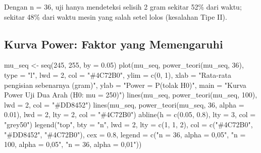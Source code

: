 \documentclass[
  indonesian,
  letterpaper,
]{book}
\newenvironment{Shaded}{\begin{snugshade}}{\end{snugshade}}
\newcommand{\AttributeTok}[1]{\textcolor[rgb]{0.40,0.45,0.13}{#1}}
\newcommand{\DecValTok}[1]{\textcolor[rgb]{0.68,0.00,0.00}{#1}}
\newcommand{\FloatTok}[1]{\textcolor[rgb]{0.68,0.00,0.00}{#1}}
\newcommand{\FunctionTok}[1]{\textcolor[rgb]{0.28,0.35,0.67}{#1}}
\newcommand{\NormalTok}[1]{\textcolor[rgb]{0.00,0.23,0.31}{#1}}
\newcommand{\OtherTok}[1]{\textcolor[rgb]{0.00,0.23,0.31}{#1}}
\newcommand{\StringTok}[1]{\textcolor[rgb]{0.13,0.47,0.30}{#1}}
\begin{document}
Dengan n = 36, uji hanya mendeteksi selisih 2 gram sekitar 52\% dari
waktu; sekitar 48\% dari waktu mesin yang salah setel lolos (kesalahan
Tipe II).

\subsection{Kurva Power: Faktor yang
Memengaruhi}\label{kurva-power-faktor-yang-memengaruhi}

\begin{Shaded}
\begin{Highlighting}[]
\NormalTok{mu\_seq }\OtherTok{\textless{}{-}} \FunctionTok{seq}\NormalTok{(}\DecValTok{245}\NormalTok{, }\DecValTok{255}\NormalTok{, }\AttributeTok{by =} \FloatTok{0.05}\NormalTok{)}
\FunctionTok{plot}\NormalTok{(mu\_seq, }\FunctionTok{power\_teori}\NormalTok{(mu\_seq, }\DecValTok{36}\NormalTok{), }\AttributeTok{type =} \StringTok{"l"}\NormalTok{, }\AttributeTok{lwd =} \DecValTok{2}\NormalTok{, }\AttributeTok{col =} \StringTok{"\#4C72B0"}\NormalTok{, }\AttributeTok{ylim =}
\FunctionTok{c}\NormalTok{(}\DecValTok{0}\NormalTok{, }\DecValTok{1}\NormalTok{),}
\AttributeTok{xlab =} \StringTok{"Rata{-}rata pengisian sebenarnya (gram)"}\NormalTok{, }\AttributeTok{ylab =} \StringTok{"Power = P(tolak H0)"}\NormalTok{,}
\AttributeTok{main =} \StringTok{"Kurva Power Uji Dua Arah (H0: mu = 250)"}\NormalTok{)}
\FunctionTok{lines}\NormalTok{(mu\_seq, }\FunctionTok{power\_teori}\NormalTok{(mu\_seq, }\DecValTok{100}\NormalTok{), }\AttributeTok{lwd =} \DecValTok{2}\NormalTok{, }\AttributeTok{col =} \StringTok{"\#DD8452"}\NormalTok{)}
\FunctionTok{lines}\NormalTok{(mu\_seq, }\FunctionTok{power\_teori}\NormalTok{(mu\_seq, }\DecValTok{36}\NormalTok{, }\AttributeTok{alpha =} \FloatTok{0.01}\NormalTok{), }\AttributeTok{lwd =} \DecValTok{2}\NormalTok{, }\AttributeTok{lty =} \DecValTok{2}\NormalTok{, }\AttributeTok{col =}
 \StringTok{"\#4C72B0"}\NormalTok{)}
\FunctionTok{abline}\NormalTok{(}\AttributeTok{h =} \FunctionTok{c}\NormalTok{(}\FloatTok{0.05}\NormalTok{, }\FloatTok{0.8}\NormalTok{), }\AttributeTok{lty =} \DecValTok{3}\NormalTok{, }\AttributeTok{col =} \StringTok{"grey50"}\NormalTok{)}
\FunctionTok{legend}\NormalTok{(}\StringTok{"top"}\NormalTok{, }\AttributeTok{bty =} \StringTok{"n"}\NormalTok{, }\AttributeTok{lwd =} \DecValTok{2}\NormalTok{, }\AttributeTok{lty =} \FunctionTok{c}\NormalTok{(}\DecValTok{1}\NormalTok{, }\DecValTok{1}\NormalTok{, }\DecValTok{2}\NormalTok{), }\AttributeTok{col =} \FunctionTok{c}\NormalTok{(}\StringTok{"\#4C72B0"}\NormalTok{, }\StringTok{"\#DD8452"}\NormalTok{,}
\StringTok{"\#4C72B0"}\NormalTok{), }\AttributeTok{cex =} \FloatTok{0.8}\NormalTok{,}
\AttributeTok{legend =} \FunctionTok{c}\NormalTok{(}\StringTok{"n = 36, alpha = 0,05"}\NormalTok{, }\StringTok{"n = 100, alpha = 0,05"}\NormalTok{, }\StringTok{"n = 36, alpha}
\StringTok{= 0,01"}\NormalTok{))}
\end{Highlighting}
\end{Shaded}
\end{document}
